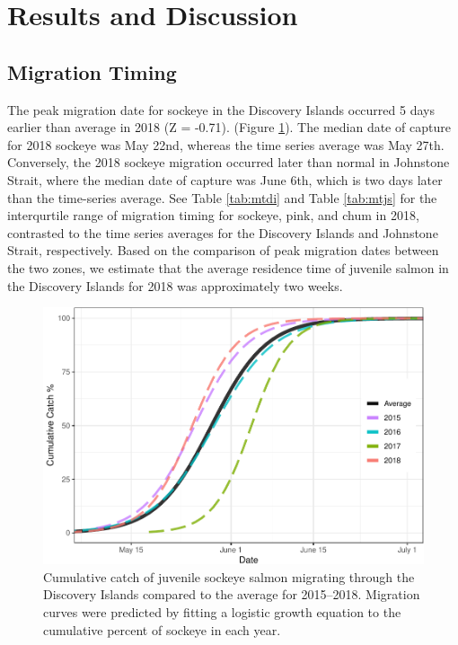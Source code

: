\documentclass[fleqn,10pt]{wlpeerj} %
\begin{document}
\section*{Results and Discussion}\label{results-and-discussion}

\subsection*{Migration Timing}\label{migration-timing}

The peak migration date for sockeye in the Discovery Islands occurred 5
days earlier than average in 2018 (Z = -0.71). (Figure \ref{fig:mt}).
The median date of capture for 2018 sockeye was May 22nd, whereas the
time series average was May 27th. Conversely, the 2018 sockeye migration
occurred later than normal in Johnstone Strait, where the median date of
capture was June 6th, which is two days later than the time-series
average. See Table \ref{tab:mtdi} and Table \ref{tab:mtjs} for the
interqurtile range of migration timing for sockeye, pink, and chum in
2018, contrasted to the time series averages for the Discovery Islands
and Johnstone Strait, respectively. Based on the comparison of peak
migration dates between the two zones, we estimate that the average
residence time of juvenile salmon in the Discovery Islands for 2018 was
approximately two weeks.

\begin{figure}[H]
\includegraphics[width=0.8\linewidth]{peer_j_migration_dynamics_files/figure-latex/mt-1} \caption{Cumulative catch of juvenile sockeye salmon migrating through the Discovery Islands compared to the average for 2015--2018. Migration curves were predicted by fitting a logistic growth equation to the cumulative percent of sockeye in each year.}\label{fig:mt}
\end{figure}
\end{document}
